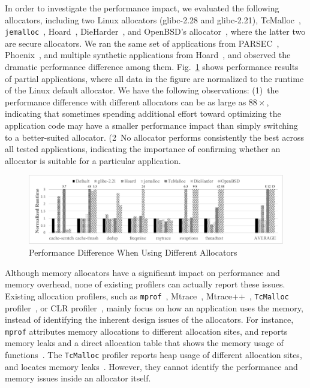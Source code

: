In order to investigate the performance impact, we evaluated the following allocators, including two Linux allocators (glibc-2.28 and glibc-2.21), TcMalloc~\citep{tcmalloc}, \texttt{jemalloc}~\citep{jemalloc}, Hoard~\citep{Hoard}, DieHarder~\citep{DieHarder}, and OpenBSD's allocator~\citep{openbsd}, where the latter two are secure allocators. We ran the same set of applications from PARSEC~\citep{parsec}, Phoenix~\citep{phoenix}, and multiple synthetic applications from Hoard~\cite{Hoard}, and observed the dramatic performance difference among them. Fig.~\ref{fig:motivation} shows performance results of partial applications, where all data in the figure are normalized to the runtime of the Linux default allocator. We have the following observations: (1)~the performance difference with different allocators can be as large as $88\times$, indicating that sometimes spending additional effort toward optimizing the application code may have a smaller performance impact than simply switching to a better-suited allocator. (2~No allocator performs consistently the best across all tested applications, indicating the importance of confirming whether an allocator is suitable for a particular application. 



\begin{figure}[!ht]
\centering
\includegraphics[width=5in]{figures/regular-performance}
\caption{Performance Difference When Using Different Allocators\label{fig:motivation}}
\end{figure}


Although memory allocators have a significant impact on performance and memory overhead, none of existing profilers can actually report these issues. Existing allocation profilers, such as \texttt{mprof}~\citep{Zorn:1988:MAP:894814}, Mtrace~\citep{mtrace}, Mtrace++~\citep{Lee:2000:DMM:786772.787150}, \texttt{TcMalloc} profiler~\citep{tcmalloc-profiler}, or CLR profiler~\citep{lupasc2014dynamic}, mainly focus on how an application uses the memory, instead of identifying the inherent design issues of the allocators. For instance, \texttt{mprof} attributes memory allocations to different allocation sites, and reports memory leaks and a direct allocation table that shows the memory usage of functions~\citep{Zorn:1988:MAP:894814}. The \texttt{TcMalloc} profiler reports heap usage of different allocation sites, and locates memory leaks~\citep{tcmalloc-profiler}. However, they cannot identify the performance and memory issues inside an allocator itself. 

